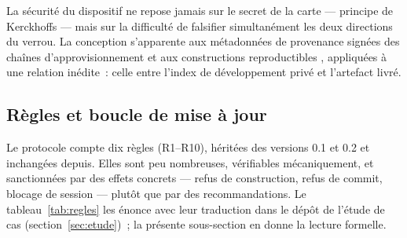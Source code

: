 La sécurité du dispositif ne repose jamais sur le secret de la carte —
principe de Kerckhoffs \cite{kerckhoffs1883} — mais sur la difficulté de
falsifier simultanément les deux directions du verrou. La conception
s’apparente aux métadonnées de provenance signées des chaînes
d’approvisionnement \cite{torresarias2019} et aux constructions
reproductibles \cite{lamb2021}, appliquées à une relation inédite~: celle
entre l’index de développement privé et l’artefact livré.

\subsection{Règles et boucle de mise à jour}\label{sec:regles}

Le protocole compte dix règles (R1–R10), héritées des versions 0.1 et 0.2
et inchangées depuis. Elles sont peu nombreuses, vérifiables
mécaniquement, et sanctionnées par des effets concrets — refus de
construction, refus de commit, blocage de session — plutôt que par des
recommandations. Le tableau~\ref{tab:regles} les énonce avec leur
traduction dans le dépôt de l’étude de cas
(section~\ref{sec:etude})~; la présente sous-section en donne la lecture
formelle.

